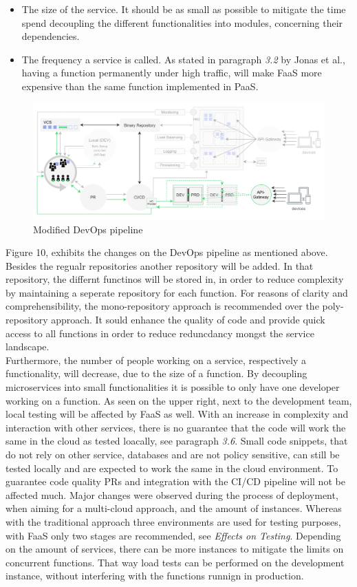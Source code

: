 \documentclass[a4paper,twoside,11pt, pagesize]{scrartcl}
\begin{document}
\begin{spacing}{1.2}
\begin{itemize}
  \item[2.] The size of the service. It should be as small as possible to mitigate the time spend decoupling the different functionalities into modules, concerning their dependencies.
  \item[3.] The frequency a service is called. As stated in paragraph \textit{3.2} by Jonas et al., having a function permanently under high traffic, will make FaaS more expensive than the same function implemented in PaaS.
\end{itemize}
\begin{figure}[H]
\label{fig:devopsModified}
\centering
\includegraphics[width=1\textwidth]{devopsModified}
\caption{Modified DevOps pipeline}
\end{figure}
Figure 10, exhibits the changes on the DevOps pipeline as mentioned above. Besides the regualr repositories another repository will be added. In that repository, the differnt functinos will be stored in, in order to reduce complexity by maintaining a seperate repository for each function. For reasons of clarity and comprehensibility, the mono-repository approach is recommended over the poly-repository approach. It sould enhance the quality of code and provide quick access to all functions in order to reduce reduncdancy mongst the service landscape. \\Furthermore, the number of people working on a service, respectively a functionality, will decrease, due to the size of a function. By decoupling microservices into small functionalities it is possible to only have one developer working on a function. As seen on the upper right, next to the development team, local testing will be affected by FaaS as well. With an increase in complexity and interaction with other services, there is no guarantee that the code will work the same in the cloud as tested loacally, see paragraph \textit{3.6}. Small code snippets, that do not rely on other service, databases and are not policy sensitive, can still be tested locally and are expected to work the same in the cloud environment. To guarantee code quality PRs and integration with the CI/CD pipeline will not be affected much. Major changes were observed during the process of deployment, when aiming for a multi-cloud approach, and the amount of instances. Whereas with the traditional approach three environments are used for testing purposes, with FaaS only two stages are recommended, see \textit{Effects on Testing}. Depending on the amount of services, there can be more instances to mitigate the limits on concurrent functions. That way load tests can be performed on the development instance, without interfering with the functions runnign in production. 
\newpage

\end{spacing}
\end{document}
